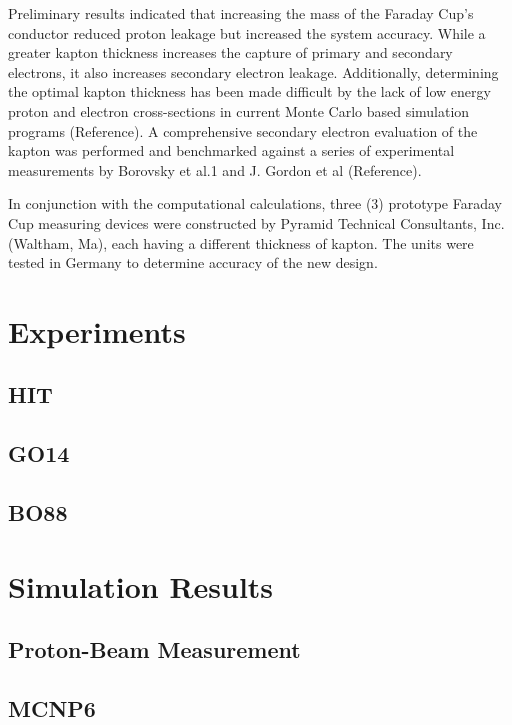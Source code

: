 \documentclass{mc2015}
\begin{document}
Preliminary results indicated that increasing the mass of the Faraday Cup’s conductor reduced proton leakage but increased the system accuracy. While a greater kapton thickness increases the capture of primary and secondary electrons, it also increases secondary electron leakage. Additionally, determining the optimal kapton thickness has been made difficult by the lack of low energy proton and electron cross-sections in current Monte Carlo based simulation programs (Reference). A comprehensive secondary electron evaluation of the kapton was performed and benchmarked against a series of experimental measurements by Borovsky et al.1 and J. Gordon et al (Reference).

In conjunction with the computational calculations, three (3) prototype Faraday Cup measuring devices were constructed by Pyramid Technical Consultants, Inc. (Waltham, Ma), each having a different thickness of kapton. The units were tested in Germany to determine accuracy of the new design. 

\section{Experiments}


\subsection{HIT}


\subsection{GO14}


\subsection{BO88}


\section{Simulation Results}


\subsection{Proton-Beam Measurement}


\subsection{MCNP6}
\end{document}
